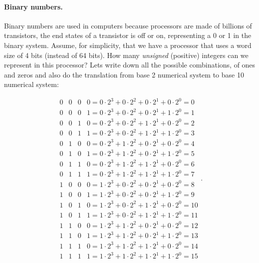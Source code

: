 \documentclass[graybox,sectrefs,envcountresetchap,open=right,final]{svmonodo}
\begin{document}
\paragraph{Binary numbers.}
Binary numbers are used in computers because processors are made of billions of transistors, the end states of a transistor is off or on, representing a 0 or 1 in the binary system. Assume, for simplicity, that we have a processor that uses a word size of 4 bits (instead of 64 bits). How many \emph{unsigned} (positive) integers can we represent in this processor? Lets write down all the possible combinations, of ones and zeros and also do the translation from base 2 numerical system to base 10 numerical system:

\begin{equation}
\begin{matrix}
0&0&0&0=0\cdot 2^3+0\cdot 2^2+0\cdot 2^1+0\cdot 2^0=0\\ 
0&0&0&1=0\cdot 2^3+0\cdot 2^2+0\cdot 2^1+1\cdot 2^0=1\\ 
0&0&1&0=0\cdot 2^3+0\cdot 2^2+1\cdot 2^1+0\cdot 2^0=2\\ 
0&0&1&1=0\cdot 2^3+0\cdot 2^2+1\cdot 2^1+1\cdot 2^0=3\\ 
0&1&0&0=0\cdot 2^3+1\cdot 2^2+0\cdot 2^1+0\cdot 2^0=4\\ 
0&1&0&1=0\cdot 2^3+1\cdot 2^2+0\cdot 2^1+1\cdot 2^0=5\\ 
0&1&1&0=0\cdot 2^3+1\cdot 2^2+1\cdot 2^1+0\cdot 2^0=6\\ 
0&1&1&1=0\cdot 2^3+1\cdot 2^2+1\cdot 2^1+1\cdot 2^0=7\\ 
1&0&0&0=1\cdot 2^3+0\cdot 2^2+0\cdot 2^1+0\cdot 2^0=8\\ 
1&0&0&1=1\cdot 2^3+0\cdot 2^2+0\cdot 2^1+1\cdot 2^0=9\\ 
1&0&1&0=1\cdot 2^3+0\cdot 2^2+1\cdot 2^1+0\cdot 2^0=10\\ 
1&0&1&1=1\cdot 2^3+0\cdot 2^2+1\cdot 2^1+1\cdot 2^0=11\\ 
1&1&0&0=1\cdot 2^3+1\cdot 2^2+0\cdot 2^1+0\cdot 2^0=12\\ 
1&1&0&1=1\cdot 2^3+1\cdot 2^2+0\cdot 2^1+1\cdot 2^0=13\\ 
1&1&1&0=1\cdot 2^3+1\cdot 2^2+1\cdot 2^1+0\cdot 2^0=14\\ 
1&1&1&1=1\cdot 2^3+1\cdot 2^2+1\cdot 2^1+1\cdot 2^0=15
\end{matrix}
.
\label{eq:taylor:bin4}
\end{equation}
\end{document}
